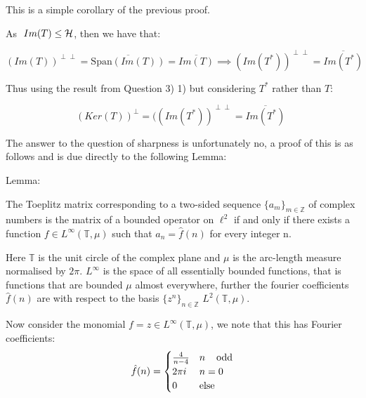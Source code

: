 \documentclass[10pt,a4paper]{article}
\begin{document}

This is a simple corollary of the previous proof. 

As  $\hspace{0.1cm} Im(T) \le \mathcal{H}$, then we have that:

\hspace{1.3cm}$(Im(T))^{\perp \perp} = \overline{\mbox{Span}(Im(T))} = \overline{Im(T)} \implies (Im(T^*))^{\perp \perp} = \overline{Im(T^*)}$

Thus using the result from Question 3) 1) but considering $T^*$ rather than $T$:

$\hspace{3cm} (Ker(T))^\perp = ((Im(T^*))^{\perp \perp} = \overline{Im(T^*)}$

\clearpage


The answer to the question of sharpness is unfortunately no, a proof of this is as follows and is due directly to the following Lemma:

Lemma: \cite{Halmos63}

The Toeplitz matrix corresponding to a two-sided sequence $\lbrace a_m \rbrace_{m \in \mathbb{Z}}$ of complex numbers is the matrix of a bounded operator on $\ell^2$ if and only if there exists a function $f \in L^\infty (\mathbb{T}, \mu)$ such that $a_n = \hat{f}(n)$ for every integer n.

Here $\mathbb{T}$ is the unit circle of the complex plane and $\mu$ is the arc-length measure normalised by $2\pi$. $L^\infty$ is the space of all essentially bounded functions, that is functions that are bounded $\mu$ almost everywhere, further the fourier  coefficients $\hat{f}(n)$ are with respect to the basis $\lbrace z^n \rbrace_{n \in \mathbb{Z}}$ \hspace{0.1cm} $L^2(\mathbb{T},\mu)$.

Now consider the monomial $f = z \in L^\infty (\mathbb{T}, \mu)$, we note that this has Fourier coefficients:
\[ \hat{f}(n) = \begin{cases}
        \frac{4}{n-4}  &  n \hspace{0.4cm} \mbox{odd}\\
        2\pi i & n = 0\\
        0 & \mbox{else} 
        \end{cases}
\]
\end{document}
